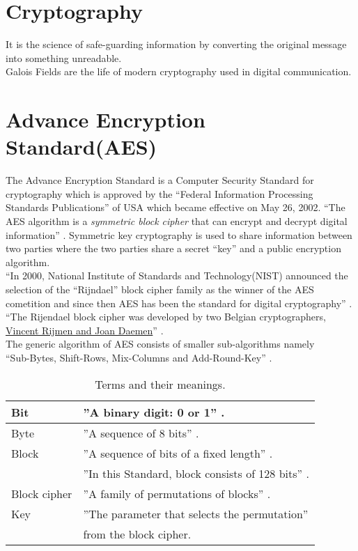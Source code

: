 \section{Cryptography}
It is the science of safe-guarding information by converting the original message into something unreadable.\\
Galois Fields are the life of modern cryptography used in digital communication.

\section{Advance Encryption Standard(AES)}
The Advance Encryption Standard is a Computer Security Standard for cryptography which is approved by the ``Federal Information Processing Standards Publications'' of USA which became effective on May 26, 2002. ``The AES algorithm is a \textit{symmetric block cipher} that can encrypt and decrypt digital information'' \cite{aes}. Symmetric key cryptography is used to share information between two parties where the two parties share a secret ``key'' and a public encryption algorithm.\\

``In 2000, National Institute of Standards and Technology(NIST) announced the selection of the ``Rijndael'' block cipher family as the winner of the AES cometition and since then AES has been the standard for digital cryptography'' \cite{aes}. ``The Rijendael block cipher was developed by two Belgian cryptographers, \underline{Vincent Rijmen and Joan Daemen}'' \cite{aes}.\\

The generic algorithm of AES consists of smaller sub-algorithms namely\\ ``Sub-Bytes, Shift-Rows, Mix-Columns and Add-Round-Key'' \cite{aes}.

\begin{table}[h!]
  \centering
\begin{tabular}{|l|l|}
  \hline
  Bit & \hspace{7mm}''A binary digit: 0 or 1'' \cite{aes}.\\
    \hline
  Byte & \hspace{7mm}''A sequence of 8 bits'' \cite{aes}.\\
    \hline
  Block & \hspace{7mm}''A sequence of bits of a fixed length'' \cite{aes}.\\
  \ & \hspace{13mm}''In this Standard, block consists of 128 bits'' \cite{aes}.\\
    \hline
  Block cipher &  \hspace{7mm}''A family of permutations of blocks'' \cite{aes}.\\
    \hline
  Key & \hspace{7mm}''The parameter that selects the permutation'' \cite{aes} \\
  \ & \hspace{13mm}from the block cipher.\\
    \hline
\end{tabular}
\caption{\small Terms and their meanings.}
\end{table}


